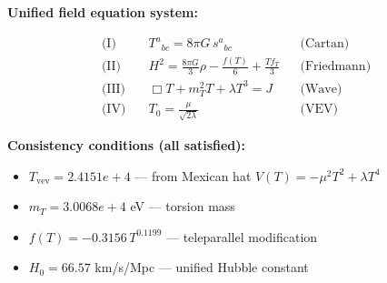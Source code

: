 
\textbf{Unified field equation system:}

\begin{align}
  \text{(I)} \quad & T^a{}_{bc} = 8\pi G \, s^a{}_{bc} && \text{(Cartan)} \\
  \text{(II)} \quad & H^2 = \frac{8\pi G}{3}\rho - \frac{f(T)}{6} + \frac{Tf_T}{3} && \text{(Friedmann)} \\
  \text{(III)} \quad & \Box T + m_T^2 T + \lambda T^3 = J && \text{(Wave)} \\
  \text{(IV)} \quad & T_0 = \frac{\mu}{\sqrt{2\lambda}} && \text{(VEV)}
\end{align}

\textbf{Consistency conditions (all satisfied):}
\begin{itemize}
  \item $T_{\text{vev}} = 2.4151e+4$ — from Mexican hat $V(T) = -\mu^2 T^2 + \lambda T^4$
  \item $m_T = 3.0068e+4$ eV — torsion mass
  \item $f(T) = -0.3156 \, T^{0.1199}$ — teleparallel modification
  \item $H_0 = 66.57$ km/s/Mpc — unified Hubble constant
\end{itemize}